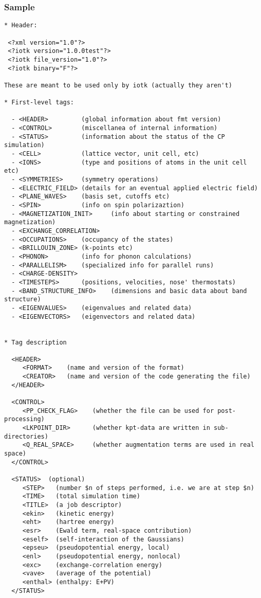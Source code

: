 \documentclass[12pt,a4paper]{article}
\begin{document}
\subsubsection{Sample}
\begin{verbatim}
* Header:

 <?xml version="1.0"?>
 <?iotk version="1.0.0test"?>
 <?iotk file_version="1.0"?>
 <?iotk binary="F"?> 

These are meant to be used only by iotk (actually they aren't)

* First-level tags:

  - <HEADER>         (global information about fmt version)
  - <CONTROL>        (miscellanea of internal information)
  - <STATUS>         (information about the status of the CP simulation)
  - <CELL>           (lattice vector, unit cell, etc)
  - <IONS>           (type and positions of atoms in the unit cell etc)
  - <SYMMETRIES>     (symmetry operations)
  - <ELECTRIC_FIELD> (details for an eventual applied electric field)
  - <PLANE_WAVES>    (basis set, cutoffs etc)
  - <SPIN>           (info on spin polarizaztion)
  - <MAGNETIZATION_INIT>     (info about starting or constrained magnetization)
  - <EXCHANGE_CORRELATION>
  - <OCCUPATIONS>    (occupancy of the states)
  - <BRILLOUIN_ZONE> (k-points etc)
  - <PHONON>         (info for phonon calculations)  
  - <PARALLELISM>    (specialized info for parallel runs)
  - <CHARGE-DENSITY>
  - <TIMESTEPS>      (positions, velocities, nose' thermostats)
  - <BAND_STRUCTURE_INFO>    (dimensions and basic data about band structure)
  - <EIGENVALUES>    (eigenvalues and related data)
  - <EIGENVECTORS>   (eigenvectors and related data)

  
* Tag description

  <HEADER> 
     <FORMAT>    (name and version of the format)
     <CREATOR>   (name and version of the code generating the file)
  </HEADER>

  <CONTROL>
     <PP_CHECK_FLAG>    (whether the file can be used for post-processing)
     <LKPOINT_DIR>      (whether kpt-data are written in sub-directories)
     <Q_REAL_SPACE>     (whether augmentation terms are used in real space)
  </CONTROL>

  <STATUS>  (optional)
     <STEP>   (number $n of steps performed, i.e. we are at step $n)
     <TIME>   (total simulation time)
     <TITLE>  (a job descriptor)
     <ekin>   (kinetic energy)
     <eht>    (hartree energy)
     <esr>    (Ewald term, real-space contribution)
     <eself>  (self-interaction of the Gaussians)
     <epseu>  (pseudopotential energy, local)
     <enl>    (pseudopotential energy, nonlocal)
     <exc>    (exchange-correlation energy)
     <vave>   (average of the potential)
     <enthal> (enthalpy: E+PV)
  </STATUS>


\end{verbatim}
\end{document}
